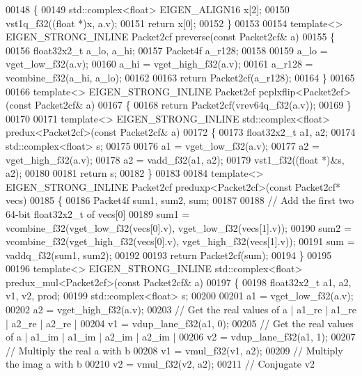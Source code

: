 \begin{DoxyCode}
00148 \{
00149   std::complex<float> EIGEN\_ALIGN16 x[2];
00150   vst1q\_f32((\textcolor{keywordtype}{float} *)x, a.v);
00151   \textcolor{keywordflow}{return} x[0];
00152 \}
00153 
00154 \textcolor{keyword}{template}<> EIGEN\_STRONG\_INLINE Packet2cf preverse(\textcolor{keyword}{const} Packet2cf& a)
00155 \{
00156   float32x2\_t a\_lo, a\_hi;
00157   Packet4f a\_r128;
00158 
00159   a\_lo = vget\_low\_f32(a.v);
00160   a\_hi = vget\_high\_f32(a.v);
00161   a\_r128 = vcombine\_f32(a\_hi, a\_lo);
00162 
00163   \textcolor{keywordflow}{return} Packet2cf(a\_r128);
00164 \}
00165 
00166 \textcolor{keyword}{template}<> EIGEN\_STRONG\_INLINE Packet2cf pcplxflip<Packet2cf>(\textcolor{keyword}{const} Packet2cf& a)
00167 \{
00168   \textcolor{keywordflow}{return} Packet2cf(vrev64q\_f32(a.v));
00169 \}
00170 
00171 \textcolor{keyword}{template}<> EIGEN\_STRONG\_INLINE std::complex<float> predux<Packet2cf>(\textcolor{keyword}{const} Packet2cf& a)
00172 \{
00173   float32x2\_t a1, a2;
00174   std::complex<float> s;
00175 
00176   a1 = vget\_low\_f32(a.v);
00177   a2 = vget\_high\_f32(a.v);
00178   a2 = vadd\_f32(a1, a2);
00179   vst1\_f32((\textcolor{keywordtype}{float} *)&s, a2);
00180 
00181   \textcolor{keywordflow}{return} s;
00182 \}
00183 
00184 \textcolor{keyword}{template}<> EIGEN\_STRONG\_INLINE Packet2cf preduxp<Packet2cf>(\textcolor{keyword}{const} Packet2cf* vecs)
00185 \{
00186   Packet4f sum1, sum2, sum;
00187 
00188   \textcolor{comment}{// Add the first two 64-bit float32x2\_t of vecs[0]}
00189   sum1 = vcombine\_f32(vget\_low\_f32(vecs[0].v), vget\_low\_f32(vecs[1].v));
00190   sum2 = vcombine\_f32(vget\_high\_f32(vecs[0].v), vget\_high\_f32(vecs[1].v));
00191   sum = vaddq\_f32(sum1, sum2);
00192 
00193   \textcolor{keywordflow}{return} Packet2cf(sum);
00194 \}
00195 
00196 \textcolor{keyword}{template}<> EIGEN\_STRONG\_INLINE std::complex<float> predux\_mul<Packet2cf>(\textcolor{keyword}{const} Packet2cf& a)
00197 \{
00198   float32x2\_t a1, a2, v1, v2, prod;
00199   std::complex<float> s;
00200 
00201   a1 = vget\_low\_f32(a.v);
00202   a2 = vget\_high\_f32(a.v);
00203    \textcolor{comment}{// Get the real values of a | a1\_re | a1\_re | a2\_re | a2\_re |}
00204   v1 = vdup\_lane\_f32(a1, 0);
00205   \textcolor{comment}{// Get the real values of a | a1\_im | a1\_im | a2\_im | a2\_im |}
00206   v2 = vdup\_lane\_f32(a1, 1);
00207   \textcolor{comment}{// Multiply the real a with b}
00208   v1 = vmul\_f32(v1, a2);
00209   \textcolor{comment}{// Multiply the imag a with b}
00210   v2 = vmul\_f32(v2, a2);
00211   \textcolor{comment}{// Conjugate v2 }

\end{DoxyCode}
